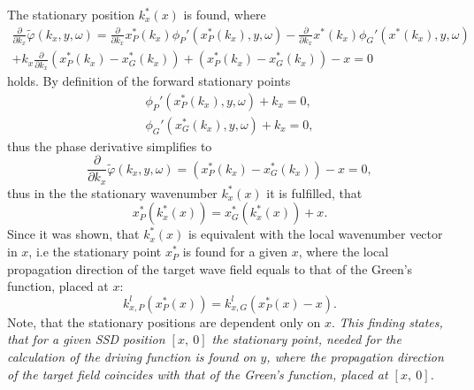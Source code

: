 \documentclass[12pt,a4paper]{article}
\begin{document}
The stationary position $k_x^*(x)$ is found, where
\begin{multline}
\frac{\partial}{\partial k_x}
\tilde{\varphi}(k_x,y,\omega) = \frac{\partial}{\partial k_x}x_P^*(k_x) \phi_P'(x_P^*(k_x),y,\omega) -  \frac{\partial}{\partial k_x} x^*(k_x)\phi_G'(x^*(k_x),y,\omega) \\ + k_x \frac{\partial}{\partial k_x}\left( x_P^*(k_x) - x_G^*(k_x) \right) + \left( x_P^*(k_x) - x_G^*(k_x) \right) -  x = 0
\end{multline}
holds.
By definition of the forward stationary points
\begin{eqnarray}
\phi_P'(x_P^*(k_x),y,\omega) + k_x = 0,\\
\phi_G'(x_G^*(k_x),y,\omega) + k_x = 0,
\label{Forward_spa}
\end{eqnarray}
thus the phase derivative simplifies to
\begin{equation}
\frac{\partial}{\partial k_x}
\tilde{\varphi}(k_x,y,\omega) = \left( x_P^*(k_x) - x_G^*(k_x) \right) -  x = 0,
\end{equation}
thus in the the stationary wavenumber $k_x^*(x)$ it is fulfilled, that 
\begin{equation}
x_P^*(k_x^*(x)) = x_G^*(k_x^*(x)) + x.
\end{equation}
Since it was shown, that $k_x^*(x)$ is equivalent with the local wavenumber vector in $x$, i.e the stationary point $x^*_P$ is found for a given $x$, where the local propagation direction of the target wave field equals to that of the Green's function, placed at $x$:
\begin{equation}
k_{x,P}^l (x_P^*(x)) = k_{x,G}^l(x_P^*(x) - x). 
\end{equation}
Note, that the stationary positions are dependent only on $x$. \emph{This finding states, that for a given SSD position $[x,\ 0]$ the stationary point, needed for the calculation of the driving function is found on $y$, where the propagation direction of the target field coincides with that of the Green's function, placed at $[x,\ 0]$.}
\end{document}
